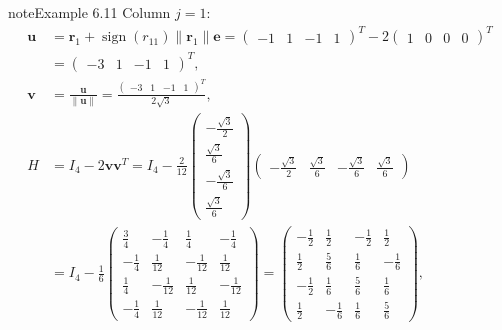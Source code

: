 \documentclass[letterpaper,10pt,english]{jupyterBook}
\begin{document}
\begin{sphinxadmonition}{note}{Example 6.11}
\sphinxAtStartPar
Column \(j = 1\):
\begin{align*}
    \mathbf{u} &= \mathbf{r}_{1} + \operatorname{sign}(r_{11}) \| \mathbf{r}_{1} \| \mathbf{e} = \left(\begin{matrix}-1 & 1 & -1 & 1\end{matrix}\right)^T - 2 \left(\begin{matrix}1 & 0 & 0 & 0\end{matrix}\right)^T \\
    &= \left(\begin{matrix}-3 & 1 & -1 & 1\end{matrix}\right)^T, \\
    \mathbf{v} &= \frac{\mathbf{u}}{\| \mathbf{u} \|} = \frac{\left(\begin{matrix}-3 & 1 & -1 & 1\end{matrix}\right)^T}{2 \sqrt{3}}, \\
    H &= I_4 - 2\mathbf{vv}^T = I_4 - \frac{2}{12}\left(\begin{matrix}- \frac{\sqrt{3}}{2}\\\frac{\sqrt{3}}{6}\\- \frac{\sqrt{3}}{6}\\\frac{\sqrt{3}}{6}\end{matrix}\right)\left(\begin{matrix}- \frac{\sqrt{3}}{2} & \frac{\sqrt{3}}{6} & - \frac{\sqrt{3}}{6} & \frac{\sqrt{3}}{6}\end{matrix}\right) \\
      &= I_4 - \frac{1}{6}\left(\begin{matrix}\frac{3}{4} & - \frac{1}{4} & \frac{1}{4} & - \frac{1}{4}\\- \frac{1}{4} & \frac{1}{12} & - \frac{1}{12} & \frac{1}{12}\\\frac{1}{4} & - \frac{1}{12} & \frac{1}{12} & - \frac{1}{12}\\- \frac{1}{4} & \frac{1}{12} & - \frac{1}{12} & \frac{1}{12}\end{matrix}\right) = \left(\begin{matrix}- \frac{1}{2} & \frac{1}{2} & - \frac{1}{2} & \frac{1}{2}\\\frac{1}{2} & \frac{5}{6} & \frac{1}{6} & - \frac{1}{6}\\- \frac{1}{2} & \frac{1}{6} & \frac{5}{6} & \frac{1}{6}\\\frac{1}{2} & - \frac{1}{6} & \frac{1}{6} & \frac{5}{6}\end{matrix}\right),
\end{align*}

\end{sphinxadmonition}
\end{document}
